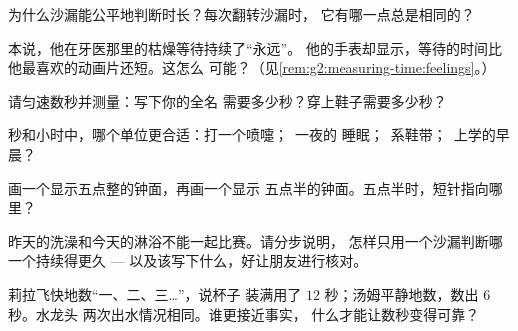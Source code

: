 \begin{exercise}[$\star$]\label{exo:g2:measuring-time:4}
为什么沙漏能公平地判断时长？每次翻转沙漏时，
它有哪一点总是相同的？
\end{exercise}

\begin{exercise}[$\star$]\label{exo:g2:measuring-time:5}
本说，他在牙医那里的枯燥等待持续了“永远”。
他的手表却显示，等待的时间比他最喜欢的动画片还短。这怎么
可能？（见\cref{rem:g2:measuring-time:feelings}。）
\end{exercise}

\begin{exercise}[$\star$]\label{exo:g2:measuring-time:6}
请匀速数秒并测量：写下你的全名
需要多少秒？穿上鞋子需要多少秒？
\end{exercise}

\begin{exercise}[$\star$]\label{exo:g2:measuring-time:7}
秒和小时中，哪个单位更合适：打一个喷嚏；\ 一夜的
睡眠；\ 系鞋带；\ 上学的早晨？
\end{exercise}

\begin{exercise}[$\star$]\label{exo:g2:measuring-time:8}
画一个显示五点整的钟面，再画一个显示
五点半的钟面。五点半时，短针指向哪里？
\end{exercise}

\begin{exercise}[$\star\star$]\label{exo:g2:measuring-time:9}
昨天的洗澡和今天的淋浴不能一起比赛。请分步说明，
怎样只用一个沙漏判断哪一个持续得更久 ---
以及该写下什么，好让朋友进行核对。
\end{exercise}

\begin{exercise}[$\star\star$]\label{exo:g2:measuring-time:10}
莉拉飞快地数“一、二、三\dots”，说杯子
装满用了 $12$ 秒；汤姆平静地数，数出 $6$ 秒。水龙头
两次出水情况相同。谁更接近事实，
什么才能让数秒变得可靠？
\end{exercise}
